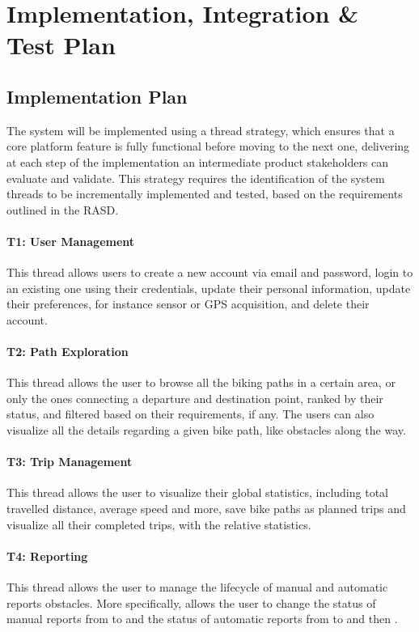 \section{Implementation, Integration \& Test Plan}
\subsection{Implementation Plan}

The system will be implemented using a thread strategy, which ensures that a core platform feature is fully functional before moving to the next one, delivering at each step of the implementation an intermediate product stakeholders can evaluate and validate. This strategy requires the identification of the system threads to be incrementally implemented and tested, based on the requirements outlined in the RASD.

\paragraph{T1: User Management} This thread allows users to create a new account via email and password, login to an existing one using their credentials, update their personal information, update their preferences, for instance sensor or GPS acquisition, and delete their account.

\paragraph{T2: Path Exploration} This thread allows the user to browse all the biking paths in a certain area, or only the ones connecting a departure and destination point, ranked by their status, and filtered based on their requirements, if any. The users can also visualize all the details regarding a given bike path, like obstacles along the way.

\paragraph{T3: Trip Management} This thread allows the user to visualize their global statistics, including total travelled distance, average speed and more, save bike paths as planned trips and visualize all their completed trips, with the relative statistics.

\paragraph{T4: Reporting} This thread allows the user to manage the lifecycle of manual and automatic reports obstacles. More specifically, allows the user to change the status of manual reports from  to  and the status of automatic reports from  to  and then .

